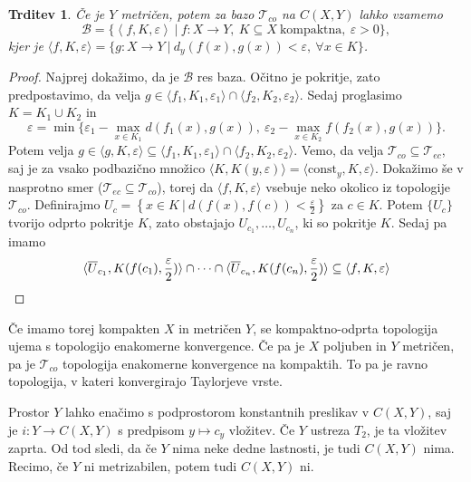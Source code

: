 \documentclass[10pt, a4paper]{article}
\newtheorem{trditev}[izr]{Trditev}
\newenvironment{noticeC}{%
  \tcolorbox[%
  notitle,
  empty,
  enhanced,  %
  breakable,
  coltext=black, 
  fontupper=\rmfamily,
  parbox=false,
  noparskip,
  sharp corners,
  boxrule=-1pt,  %
  frame hidden,
  left=7pt,  %
  right=7pt,
  top=5pt,
  bottom=5pt,
  before skip=2.5ex plus 2pt,
  after skip=2.5ex plus 2pt,
  overlay unbroken and last={%
  },
  ]}
{\endtcolorbox}
\newenvironment{dokaz}%
  {\begin{noticeC}\begin{proof}}%
  {\end{proof}\end{noticeC}}
\newcommand{\sprod}[2]{\langle {#1},{#2} \rangle}
\newcommand{\topo}[1]{\mathcal{#1}}
\begin{document}
\begin{trditev}
  Če je $Y$ metričen, potem za bazo $\topo{T}_{co}$ na $C(X, Y)$ lahko vzamemo 
  $$\mathcal{B} = \{\left\langle f, K, \varepsilon\right\rangle\ |\ f: X \to Y,\ K \subseteq X\ \mathrm{\text{kompaktna}},\ \varepsilon > 0 \},$$
  kjer je $\langle f, K, \varepsilon \rangle = \{g: X \to Y\ |\ d_y (f(x), g(x)) < \varepsilon,\ \forall x \in K\}$.
\end{trditev}

\begin{dokaz}
  Najprej dokažimo, da je $\mathcal{B}$ res baza. Očitno je pokritje, zato predpostavimo, da velja 
  $g \in \langle f_1, K_1, \varepsilon_1 \rangle \cap \langle f_2, K_2, \varepsilon_2 \rangle$.
  Sedaj proglasimo $K = K_1 \cup K_2$ in 
  $$\varepsilon = \min \{\varepsilon_1 - \max_{x \in K_1} d(f_1(x), g(x)),\ \varepsilon_2 - \max_{x \in K_2} f(f_2 (x), g(x))\}.$$
  Potem velja $g \in \langle g, K, \varepsilon \rangle \subseteq \langle f_1, K_1, \varepsilon_1 \rangle \cap \langle f_2, K_2, \varepsilon_2 \rangle$.
  Vemo, da velja $\mathcal{T}_{co} \subseteq \topo{T}_{ec}$, saj je za vsako podbazično množico $\sprod{K}{K(y, \varepsilon)} = \langle \mathrm{const}_y, K, \varepsilon \rangle$.
  Dokažimo še v nasprotno smer ($\topo{T}_{ec} \subseteq \mathcal{T}_{co}$), torej da $\langle f, K, \varepsilon \rangle$ vsebuje neko okolico iz topologije $\topo{T}_{co}$.
  Definirajmo $U_c = \left\lbrace x \in K\ |\ d(f(x), f(c)) < \frac{\varepsilon}{2}\right\rbrace$ za $c \in K$.
  Potem $\{U_c\}$ tvorijo odprto pokritje $K$, zato obstajajo $U_{c_1},\dots, U_{c_n}$, ki so pokritje $K$.
  Sedaj pa imamo 
  \begin{equation*}
    \sprod{\overline{U}_{c_1}}{K(f(c_1),\frac{\varepsilon}{2})} \cap \dots \cap \sprod{\overline{U}_{c_n}}{K(f(c_n),\frac{\varepsilon}{2})} \subseteq \langle f, K, \varepsilon \rangle \qedhere
  \end{equation*}
\end{dokaz}

Če imamo torej kompakten $X$ in metričen $Y$, se kompaktno-odprta topologija ujema s topologijo enakomerne konvergence.
Če pa je $X$ poljuben in $Y$ metričen, pa je $\topo{T}_{co}$ topologija enakomerne konvergence na kompaktih.
To pa je ravno topologija, v kateri konvergirajo Taylorjeve vrste.

Prostor $Y$ lahko enačimo s podprostorom konstantnih preslikav v $C(X, Y)$, saj je 
$i: Y \to C(X, Y)$ s predpisom $y \mapsto c_y$ vložitev.
Če $Y$ ustreza $T_2$, je ta vložitev zaprta. Od tod sledi, da če $Y$ nima neke dedne lastnosti, je tudi $C(X, Y)$ nima.
Recimo, če $Y$ ni metrizabilen, potem tudi $C(X, Y)$ ni.
\end{document}
